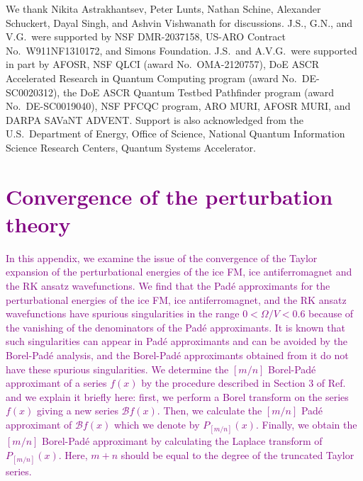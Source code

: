 \documentclass[twocolumn,superscriptaddress,amsmath,amssymb,aps,prx,nofootinbib]{revtex4-2}
\newcommand{\newtext}[1]{\textcolor{purple}{#1}}
\begin{document}
\begin{acknowledgments}
We thank Nikita Astrakhantsev, Peter Lunts, Nathan Schine, Alexander Schuckert, Dayal Singh, and Ashvin Vishwanath for discussions. J.S., G.N., and V.G.~were  supported by NSF DMR-2037158, US-ARO Contract No.~W911NF1310172, and Simons Foundation. J.S.~and A.V.G.~were supported in part by AFOSR, NSF QLCI (award No.~OMA-2120757), DoE ASCR Accelerated Research in Quantum Computing program (award No.~DE-SC0020312), the DoE ASCR Quantum Testbed Pathfinder program (award No.~DE-SC0019040), NSF PFCQC program, ARO MURI, AFOSR MURI, and DARPA SAVaNT ADVENT. Support is also acknowledged from the U.S.~Department of Energy, Office of Science, National Quantum Information Science Research Centers, Quantum Systems Accelerator.  

\end{acknowledgments}



\appendix

\section{\newtext{Convergence of the perturbation theory}}\label{app:perturbation}

\newtext{In this appendix, we examine the issue of the convergence of the Taylor expansion of the perturbational energies of the ice FM, ice antiferromagnet and the RK ansatz wavefunctions. 
We find that the Pad\'e approximants for the perturbational energies of the ice FM, ice antiferromagnet, and the RK ansatz wavefunctions  have spurious singularities in the range $0 < \Omega/V < 0.6$ because of the vanishing of the denominators of the Pad\'e approximants. 
It is known that such singularities can appear in Pad\'e approximants and can be avoided by the Borel-Pad\'e analysis, and the Borel-Pad\'e approximants obtained from it do not have these spurious singularities. 
We determine the $[m/n]$ Borel-Pad\'e approximant of a series $f(x)$ by the procedure described in Section 3 of Ref.~\cite{deeb2016comparison} and we explain it briefly here: first, we perform a Borel transform on the series $f(x)$ giving a new series $\mathcal{B}f(x)$. Then, we calculate the $[m/n]$ Pad\'e approximant of $\mathcal{B}f(x)$ which we denote by $P_{[m/n]}(x)$. 
Finally, we obtain the $[m/n]$ Borel-Pad\'e approximant by calculating the Laplace transform of $P_{[m/n]}(x)$.
Here, $m+n$ should be equal to the degree of the truncated Taylor series. }
\end{document}
